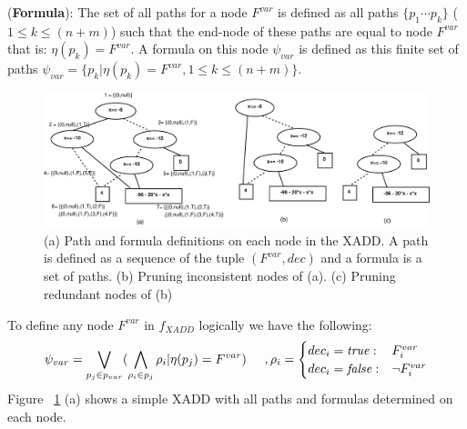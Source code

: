 \documentclass[twoside,11pt]{article}
\newenvironment{mydef}[1][Definition]{\begin{trivlist}
\item[\hskip \labelsep {\bfseries #1}]}{\end{trivlist}}
\begin{document}
\begin{mydef}(\textbf{Formula}):
The set of all paths for a node $F^{var}$ is defined as all paths $\lbrace p_1 \cdots p_k \rbrace$ ($1 \leq k \leq (n+m)$) such that the end-node of these paths are equal to node $F^{var}$ that is: $\eta(p_k) = F^{var}$. A formula on this node $\psi_{var} $ is defined as this finite set of paths $\psi_{var} = \lbrace p_k | \eta(p_k) = F^{var}, 1 \leq k \leq (n+m) \rbrace$. 
\end{mydef}
\vspace{10mm}
\begin{figure}[t!]
\centering
\vspace{-3mm}
\includegraphics[width=1.0\textwidth]{Figures1/diagrams/path_formula2.pdf}
\vspace{-9mm}
\caption{\footnotesize (a) Path and formula definitions on each node in the XADD. A path is defined as a sequence of the tuple $(F^{var},\mathit{dec})$ and a formula is a set of paths. (b) Pruning inconsistent nodes of (a). (c) Pruning redundant nodes of (b)}
\label{fig:path_formula}
\vspace{-4mm}
\end{figure}
\vspace{-7mm}
To define any node $F^{var}$ in $f_{XADD}$ logically we have the following:
\begin{equation*}
\psi_{var} = \bigvee_{p_j \in p_{var}} (\bigwedge_{\rho_i \in p_j} \rho_i |\eta(p_j) = F^{var})
\hspace{5mm},
\rho_i =
\begin{cases}
  dec_i = \mathit{true}: & F_i^{var} \\ 
dec_i = \mathit{false}: & \neg F_i^{var} \\ 
\end{cases}
\end{equation*} 
Figure ~\ref{fig:path_formula} (a) shows a simple XADD with all paths and formulas determined on each node. %
\end{document}
